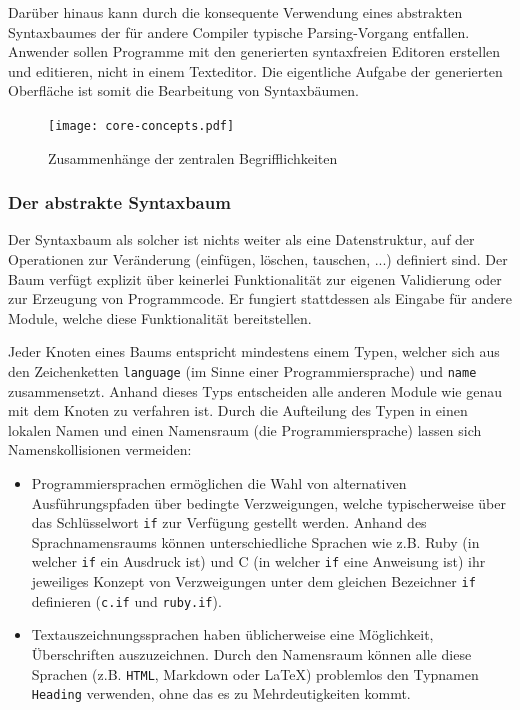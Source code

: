 \documentclass[paper=a4,fontsize=11pt,parskip=half]{scrartcl}
\begin{document}
Darüber hinaus kann durch die konsequente Verwendung eines abstrakten Syntaxbaumes der für andere Compiler typische Parsing-Vorgang entfallen. Anwender sollen Programme mit den generierten syntaxfreien Editoren erstellen und editieren, nicht in einem Texteditor. Die eigentliche Aufgabe der generierten Oberfläche ist somit die Bearbeitung von Syntaxbäumen.

\begin{figure}[h]
  \texttt{[image: core-concepts.pdf]}
  \caption{Zusammenhänge der zentralen Begrifflichkeiten}
  \label{fig:core-relations}
\end{figure}

\subsubsection{Der abstrakte Syntaxbaum}

Der Syntaxbaum als solcher ist nichts weiter als eine Datenstruktur, auf der Operationen zur Veränderung (einfügen, löschen, tauschen, ...) definiert sind. Der Baum verfügt explizit über keinerlei Funktionalität zur eigenen Validierung oder zur Erzeugung von Programmcode. Er fungiert stattdessen als Eingabe für andere Module, welche diese Funktionalität bereitstellen.

Jeder Knoten eines Baums entspricht mindestens einem Typen, welcher sich aus den Zeichenketten \texttt{language} (im Sinne einer Programmiersprache) und \texttt{name} zusammensetzt. Anhand dieses Typs entscheiden alle anderen Module wie genau mit dem Knoten zu verfahren ist. Durch die Aufteilung des Typen in einen lokalen Namen und einen Namensraum (die Programmiersprache) lassen sich Namenskollisionen vermeiden:

\begin{itemize}
\item Programmiersprachen ermöglichen die Wahl von alternativen Ausführungspfaden  über bedingte Verzweigungen, welche typischerweise über das Schlüsselwort \texttt{if} zur Verfügung gestellt werden. Anhand des Sprachnamensraums können unterschiedliche Sprachen wie z.B. Ruby (in welcher \texttt{if} ein Ausdruck ist) und C (in welcher \texttt{if} eine Anweisung ist) ihr jeweiliges Konzept von Verzweigungen unter dem gleichen Bezeichner \texttt{if} definieren (\texttt{c.if} und \texttt{ruby.if}).
\item Textauszeichnungssprachen haben üblicherweise eine Möglichkeit, Überschriften auszuzeichnen. Durch den Namensraum können alle diese Sprachen (z.B. \texttt{HTML}, Markdown oder \LaTeX) problemlos den Typnamen \texttt{Heading} verwenden, ohne das es zu Mehrdeutigkeiten kommt.
\end{itemize}
\end{document}
